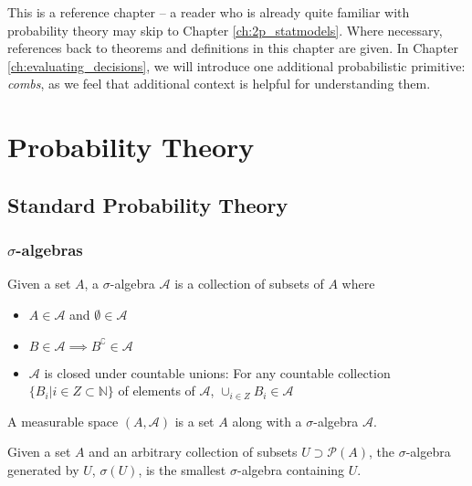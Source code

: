 This is a reference chapter -- a reader who is already quite familiar with probability theory may skip to Chapter \ref{ch:2p_statmodels}. Where necessary, references back to theorems and definitions in this chapter are given. In Chapter \ref{ch:evaluating_decisions}, we will introduce one additional probabilistic primitive: \emph{combs}, as we feel that additional context is helpful for understanding them.

\section{Probability Theory}

\subsection{Standard Probability Theory}\label{sec:standard_prob}

\subsubsection{$\sigma$-algebras}

\begin{definition}
Given a set $A$, a $\sigma$-algebra $\mathcal{A}$ is a collection of subsets of $A$ where
\begin{itemize}
	\item $A\in \mathcal{A}$ and $\emptyset\in \mathcal{A}$
	\item $B\in \mathcal{A}\implies B^{\complement}\in\mathcal{A}$
	\item $\mathcal{A}$ is closed under countable unions: For any countable collection $\{B_i|i\in Z\subset \mathbb{N}\}$ of elements of $\mathcal{A}$, $\cup_{i\in Z}B_i\in \mathcal{A}$ 
\end{itemize}
\end{definition}

\begin{definition}
A measurable space $(A,\mathcal{A})$ is a set $A$ along with a $\sigma$-algebra $\mathcal{A}$.
\end{definition}

\begin{definition}
Given a set $A$ and an arbitrary collection of subsets $U\supset\mathscr{P}(A)$, the $\sigma$-algebra generated by $U$, $\sigma(U)$, is the smallest $\sigma$-algebra containing $U$.
\end{definition}

